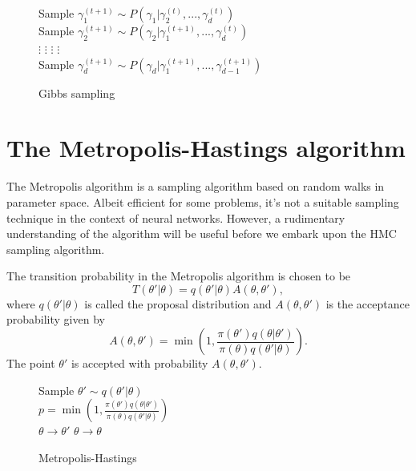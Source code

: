 \begin{figure}[H]
  \begin{algorithm}[H]
    \caption{Gibbs sampling}
    \begin{algorithmic}
      \State Sample $\gamma^{(t+1)}_1 \sim P(\gamma_1|\gamma_2^{(t)},...,\gamma_d^{(t)})$ \\
      \State Sample $\gamma^{(t+1)}_2 \sim P(\gamma_2|\gamma_1^{(t+1)},...,\gamma_d^{(t)})$\\
      \State $\vdots$ \qquad  \qquad $\vdots$ \qquad  \qquad $\vdots$ \qquad \qquad $\vdots$\\
      \State Sample $\gamma^{(t+1)}_d \sim P(\gamma_d|\gamma_1^{(t+1)},...,\gamma_{d-1}^{(t+1)})$
    \end{algorithmic}
  \end{algorithm}
\end{figure}



\section{The Metropolis-Hastings algorithm}
The Metropolis algorithm \cite{metropolis} is a sampling algorithm based on random walks in parameter space. Albeit efficient for some
problems, it's not a suitable sampling technique in the context of neural networks. However, a rudimentary understanding of the algorithm will be useful before we embark upon the HMC sampling algorithm. 

The transition probability in the Metropolis algorithm is chosen to be
\begin{equation}
  T(\theta'|\theta) = q(\theta'|\theta)A(\theta,\theta'),
\end{equation}
where $q(\theta'|\theta)$ is called the proposal distribution and $A(\theta, \theta')$ is the acceptance probability given by
\begin{equation}
  A(\theta, \theta') = \min \left(1, \frac{\pi(\theta')q(\theta|\theta')}{\pi(\theta)q(\theta'|\theta)}\right).
\end{equation}
The point $\theta'$ is accepted with probability $A(\theta, \theta')$. 

\begin{figure}[H]
  \begin{algorithm}[H]
    \caption{Metropolis-Hastings}
    \begin{algorithmic}
      \State Sample $\theta' \sim q(\theta'|\theta)$\\
      \State $p = \min \left(1, \frac{\pi(\theta')q(\theta|\theta')}{\pi(\theta)q(\theta'|\theta)}\right)$\\
        \State $\theta \to \theta'$ 
      \Else
        \State $\theta \to \theta$  
      \EndIf
    \end{algorithmic}
  \end{algorithm}
\end{figure}


